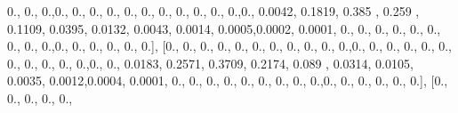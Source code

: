 \documentclass[
]{book}
\newenvironment{Shaded}{\begin{snugshade}}{\end{snugshade}}
\newcommand{\FloatTok}[1]{\textcolor[rgb]{0.00,0.00,0.81}{#1}}
\newcommand{\NormalTok}[1]{#1}
\begin{document}
\begin{Shaded}
\begin{Highlighting}[]
\FloatTok{0.}\NormalTok{, }\FloatTok{0.}\NormalTok{, }\FloatTok{0.}\NormalTok{,}\FloatTok{0.}\NormalTok{, }\FloatTok{0.}\NormalTok{, }\FloatTok{0.}\NormalTok{, }\FloatTok{0.}\NormalTok{, }\FloatTok{0.}\NormalTok{, }\FloatTok{0.}\NormalTok{, }\FloatTok{0.}\NormalTok{, }\FloatTok{0.}\NormalTok{, }\FloatTok{0.}\NormalTok{, }\FloatTok{0.}\NormalTok{, }\FloatTok{0.}\NormalTok{,}\FloatTok{0.}\NormalTok{, }\FloatTok{0.0042}\NormalTok{, }\FloatTok{0.1819}\NormalTok{, }\FloatTok{0.385}
\NormalTok{, }\FloatTok{0.259}\NormalTok{ , }\FloatTok{0.1109}\NormalTok{, }\FloatTok{0.0395}\NormalTok{, }\FloatTok{0.0132}\NormalTok{, }\FloatTok{0.0043}\NormalTok{, }\FloatTok{0.0014}\NormalTok{, }\FloatTok{0.0005}\NormalTok{,}\FloatTok{0.0002}\NormalTok{, }\FloatTok{0.0001}\NormalTok{, }\FloatTok{0.}\NormalTok{, }\FloatTok{0.}\NormalTok{,}
\FloatTok{0.}\NormalTok{, }\FloatTok{0.}\NormalTok{, }\FloatTok{0.}\NormalTok{, }\FloatTok{0.}\NormalTok{, }\FloatTok{0.}\NormalTok{, }\FloatTok{0.}\NormalTok{, }\FloatTok{0.}\NormalTok{,}\FloatTok{0.}\NormalTok{, }\FloatTok{0.}\NormalTok{, }\FloatTok{0.}\NormalTok{, }\FloatTok{0.}\NormalTok{, }\FloatTok{0.}\NormalTok{, }\FloatTok{0.}\NormalTok{], [}\FloatTok{0.}\NormalTok{, }\FloatTok{0.}\NormalTok{, }\FloatTok{0.}\NormalTok{, }\FloatTok{0.}\NormalTok{, }\FloatTok{0.}\NormalTok{, }\FloatTok{0.}\NormalTok{, }\FloatTok{0.}\NormalTok{,}
\FloatTok{0.}\NormalTok{, }\FloatTok{0.}\NormalTok{, }\FloatTok{0.}\NormalTok{, }\FloatTok{0.}\NormalTok{,}\FloatTok{0.}\NormalTok{, }\FloatTok{0.}\NormalTok{, }\FloatTok{0.}\NormalTok{, }\FloatTok{0.}\NormalTok{, }\FloatTok{0.}\NormalTok{, }\FloatTok{0.}\NormalTok{, }\FloatTok{0.}\NormalTok{, }\FloatTok{0.}\NormalTok{, }\FloatTok{0.}\NormalTok{, }\FloatTok{0.}\NormalTok{, }\FloatTok{0.}\NormalTok{,}\FloatTok{0.}\NormalTok{, }\FloatTok{0.}\NormalTok{, }\FloatTok{0.0183}\NormalTok{,}
\FloatTok{0.2571}\NormalTok{, }\FloatTok{0.3709}\NormalTok{, }\FloatTok{0.2174}\NormalTok{, }\FloatTok{0.089}\NormalTok{ , }\FloatTok{0.0314}\NormalTok{, }\FloatTok{0.0105}\NormalTok{, }\FloatTok{0.0035}\NormalTok{, }\FloatTok{0.0012}\NormalTok{,}\FloatTok{0.0004}\NormalTok{, }\FloatTok{0.0001}\NormalTok{,}
\FloatTok{0.}\NormalTok{, }\FloatTok{0.}\NormalTok{, }\FloatTok{0.}\NormalTok{, }\FloatTok{0.}\NormalTok{, }\FloatTok{0.}\NormalTok{, }\FloatTok{0.}\NormalTok{, }\FloatTok{0.}\NormalTok{, }\FloatTok{0.}\NormalTok{, }\FloatTok{0.}\NormalTok{,}\FloatTok{0.}\NormalTok{, }\FloatTok{0.}\NormalTok{, }\FloatTok{0.}\NormalTok{, }\FloatTok{0.}\NormalTok{, }\FloatTok{0.}\NormalTok{, }\FloatTok{0.}\NormalTok{], [}\FloatTok{0.}\NormalTok{, }\FloatTok{0.}\NormalTok{, }\FloatTok{0.}\NormalTok{, }\FloatTok{0.}\NormalTok{, }\FloatTok{0.}\NormalTok{,}

\end{Highlighting}
\end{Shaded}
\end{document}
